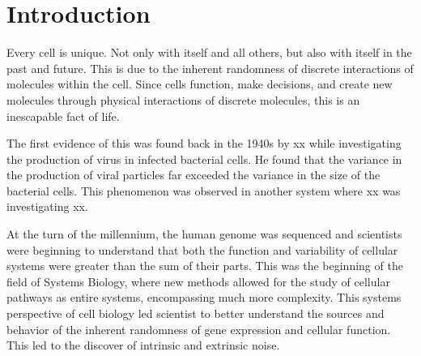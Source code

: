 \chapter{Introduction}

Every cell is unique. Not only with itself and all others, but also with itself in the past and future. This is due to the inherent randomness of discrete interactions of molecules within the cell. Since cells function, make decisions, and create new molecules through physical interactions of discrete molecules, this is an inescapable fact of life.

The first evidence of this was found back in the 1940s by xx while investigating the production of virus in infected bacterial cells. He found that the variance in the production of viral particles far exceeded the variance in the size of the bacterial cells. This phenomenon was observed in another system where xx was investigating xx. 

At the turn of the millennium, the human genome was sequenced and scientists were beginning to understand that both the function and variability of cellular systems were greater than the sum of their parts. This was the beginning of the field of Systems Biology, where new methods allowed for the study of cellular pathways as entire systems, encompassing much more complexity. This systems perspective of cell biology led scientist to better understand the sources and behavior of the inherent randomness of gene expression and cellular function. This led to the discover of intrinsic and extrinsic noise.

